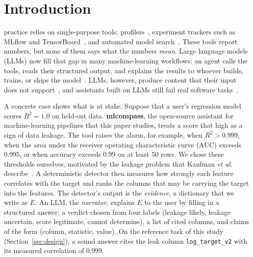 \documentclass[journal]{IEEEtran}
\begin{document}
\maketitle
\IEEEdisplaynontitleabstractindextext
\IEEEpeerreviewmaketitle

\section{Introduction}\label{sec:intro}

 practice relies on single-purpose tools:
profilers~\cite{ydata}, experiment trackers such as MLflow and
TensorBoard~\cite{mlflow,tensorflow}, and automated model
search~\cite{autosklearn}. These tools report numbers, but none of them says what
the numbers \emph{mean}. Large language models (LLMs) now fill
that gap in many machine-learning workflows: an agent calls the tools, reads
their structured output, and explains the results to whoever builds, trains,
or ships the model~\cite{react,toolformer,mcp}. LLMs, however, produce
content that their input does not support~\cite{ji,huang}, and assistants
built on LLMs still fail real software tasks~\cite{codex,swebench}.

A concrete case shows what is at stake. Suppose that a user's regression
model scores $R^2=1.0$ on held-out data. \textbf{mlcompass}, the open-source
assistant for machine-learning pipelines that this paper studies, treats a
score that high as a sign of data leakage. The tool raises the alarm, for
example, when $R^2>0.999$, when the area under the receiver operating
characteristic curve (AUC) exceeds 0.995, or when accuracy exceeds 0.99 on at
least 50 rows. We chose these thresholds ourselves, motivated by the leakage
problem that Kaufman \emph{et al.} describe~\cite{leakage}. A deterministic
detector then measures how strongly each feature correlates with the target
and ranks the columns that may be carrying the target into the features. The
detector's output is the \emph{evidence}, a dictionary that we write as $E$.
An LLM, the \emph{narrator}, explains $E$ to the user by filling in a
structured answer: a verdict chosen from four labels (leakage likely, leakage
uncertain, score legitimate, cannot determine), a list of cited columns, and
claims of the form (column, statistic, value). On the reference task of this
study (Section~\ref{sec:design}), a sound answer cites the leak column
\texttt{log\_target\_v2} with its measured correlation of 0.999.
\end{document}
